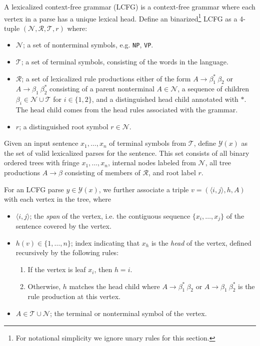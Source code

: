 \documentclass[11pt,letterpaper]{article}
\newcommand{\nonterms}{\mathcal{N}}
\newcommand{\rules}{\mathcal{R}}
\newcommand{\terms}{\mathcal{T}}
\newcommand{\Span}[1]{\langle #1 \rangle}
\newcommand{\Tag}[1]{\texttt{#1}}
\newcommand{\Root}{r}
\newcommand{\RuleA}[3]{#1 \rightarrow #2^*\ #3}
\newcommand{\RuleB}[3]{#1 \rightarrow #2\ #3^*}
\begin{document}
A lexicalized context-free grammar (LCFG) is a context-free grammar where each vertex in a parse has a unique lexical head. Define an binarized\footnote{For notational simplicity we ignore unary rules for this section.} LCFG as a 4-tuple $(\nonterms, \rules, \terms, \Root)$ where:
\begin{itemize}
\item $\nonterms$; a set of nonterminal symbols, e.g. \Tag{NP}, \Tag{VP}.
\item $\terms$; a set of terminal symbols, consisting of the words in the language.
\item $\rules$; a set of lexicalized rule productions either of the form $\RuleA{A}{\beta_1}{\beta_2}$ or $\RuleB{A}{\beta_1}{\beta_2}$  consisting of a parent nonterminal $A \in \nonterms$, a sequence of children $\beta_i \in \nonterms \cup \terms$ for $i \in \{1, 2\}$, and a distinguished head child annotated with $*$. The head child comes from the head rules associated with the grammar.
\item $\Root$; a distinguished root symbol $\Root \in \nonterms$.
\end{itemize}

Given an input sentence $x_1, \ldots, x_n$ of terminal symbols from $\terms$, define $\mathcal{Y}(x)$ as the set of valid lexicalized parses for the sentence. This set consists of all binary ordered trees with fringe $x_1, \ldots,  x_n$, internal nodes labeled from $\nonterms$, all tree productions  $A \rightarrow \beta$ consisting of members of $\rules$, and root label $\Root$.


For an LCFG parse $y \in \mathcal{Y}(x)$,
we further associate a triple $v = (\Span{i, j}, h, A)$ with each vertex in the tree, where



\begin{itemize}
\item $\Span{i,j}$; the \textit{span}  of the vertex, i.e. the contiguous sequence $\{x_i, \ldots, x_j\}$ of the sentence covered by the vertex.

\item $h(v) \in \{1, \ldots, n\}$; index indicating that $x_h$ is the \textit{head} of the vertex, defined recursively by the following rules:
  \begin{enumerate}
  \item  If the vertex is leaf $x_i$, then $h=i$.
  \item Otherwise,  $h$ matches the head child where $\RuleA{A}{\beta_1}{\beta_2}$ or $\RuleB{A}{\beta_1}{\beta_2}$  is the rule production at this vertex.
  \end{enumerate}

\item $A \in \terms \cup \nonterms$; the terminal or nonterminal symbol of the vertex.
\end{itemize}
\end{document}
